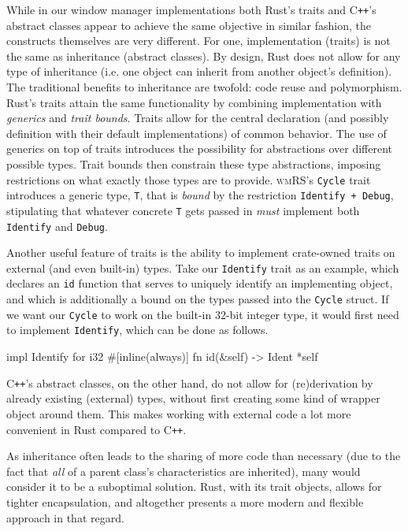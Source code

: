 While   in  our   window  manager   implementations  both   Rust's  traits   and
C\texttt{++}'s abstract classes appear to  achieve the same objective in similar
fashion, the constructs  themselves are very different.  For one, implementation
(traits) is not the same as inheritance (abstract classes). By design, Rust does
not allow for any type of inheritance  (i.e. one object can inherit from another
object's definition). The traditional benefits  to inheritance are twofold: code
reuse and polymorphism. Rust's traits attain the same functionality by combining
implementation with  \textit{generics} and  \textit{trait bounds}.  Traits allow
for  the  central  declaration  (and  possibly  definition  with  their  default
implementations)  of common  behavior.  The use  of generics  on  top of  traits
introduces the possibility for abstractions over different possible types. Trait
bounds then  constrain these  type abstractions,  imposing restrictions  on what
exactly  those types  are to  provide. \textsc{wmRS}'s  \texttt{Cycle}
trait introduces a generic type, \texttt{T}, that is \textit{bound} by
the restriction  \texttt{Identify + Debug}, stipulating  that whatever
concrete  \texttt{T}  gets  passed  in  \textit{must}  implement  both
\texttt{Identify} and \texttt{Debug}.

Another useful feature of traits is  the ability to implement crate-owned traits
on  external (and  even  built-in) types.  Take our  \texttt{Identify}
trait  as an  example,  which declares  an  \texttt{id} function  that
serves to uniquely identify an implementing  object, and which is additionally a
bound on the  types passed into the \texttt{Cycle} struct.  If we want
our \texttt{Cycle}  to work  on the built-in  32-bit integer  type, it
would first need to implement  \texttt{Identify}, which can be done as
follows.

\begin{rustblock}
  impl Identify for i32 {
    #[inline(always)]
    fn id(&self) -> Ident {
      *self
    }
  }
\end{rustblock}

C\texttt{++}'s  abstract  classes,   on  the  other  hand,  do   not  allow  for
(re)derivation by already existing (external) types, without first creating some
kind of wrapper object around them. This  makes working with external code a lot
more convenient in Rust compared to C\texttt{++}.

As inheritance often  leads to the sharing  of more code than  necessary (due to
the fact that  \textit{all} of a parent class's  characteristics are inherited),
many  would consider  it  to be  a  suboptimal solution.  Rust,  with its  trait
objects, allows for tighter encapsulation, and altogether presents a more modern
and flexible approach in that regard.
